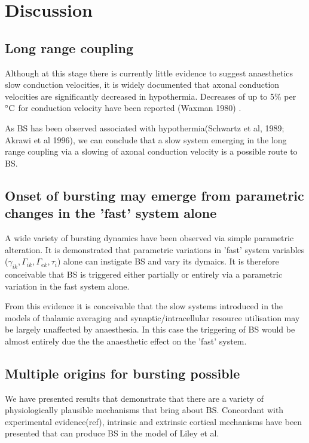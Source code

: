 \documentclass[a4paper,12pt]{article}
\begin{document}
\section{Discussion}

\subsection{Long range coupling}
Although at this stage there is currently little evidence to suggest anaesthetics slow conduction velocities, it is
widely documented that axonal conduction velocities are significantly decreased in hypothermia. Decreases of up to 5\%
per $^{\circ}{\rm C}$ for conduction velocity have been reported (Waxman 1980) .

As BS has been observed associated with hypothermia(Schwartz et al, 1989; Akrawi et al 1996), we can conclude that  a slow system emerging in the long range coupling via a slowing of axonal conduction velocity is a possible route
to BS.

\subsection{Onset of bursting may emerge from parametric changes in the 'fast' system alone}
A wide variety of bursting dynamics have been observed via simple parametric alteration. It is demonstrated that parametric variations in
'fast' system variables ($\gamma_{ik}, \Gamma_{ik}, \Gamma_{ek}, \tau_i$) alone can instigate BS and vary its dymaics. It is therefore conceivable that BS is triggered either partially or entirely via a parametric variation in the fast system alone.

From this evidence it is conceivable that the slow systems introduced in the models of thalamic averaging and synaptic/intracellular resource utilisation may be largely unaffected by anaesthesia. In this case the triggering of BS would be almost entirely due the the anaesthetic effect on the 'fast' system.

\subsection{Multiple origins for bursting possible}
We have presented results that demonstrate that there are a variety of physiologically plausible mechanisms that bring about
BS. Concordant with experimental evidence(ref), intrinsic and extrinsic cortical mechanisms have been
presented that can produce BS in the model of Liley et al.
\end{document}
